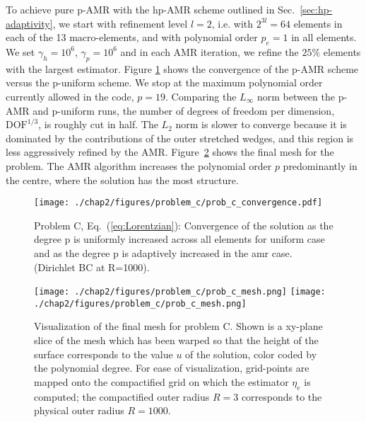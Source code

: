 To achieve pure p-AMR with the hp-AMR scheme
outlined in Sec.~\ref{sec:hp-adaptivity}, we
start with refinement level $l=2$, i.e. with $2^{3 l}=64$ elements in each of the 13 macro-elements, and with polynomial order $p_e=1$ in all elements. We
set $\gamma_h\! =\! 10^6$,
$\gamma_p\! =\! 10^6$ and in each AMR iteration, we refine the $25\%$ elements with the
largest estimator. Figure \ref{fig:prob_c_convergence} shows the
convergence of the p-AMR scheme versus the p-uniform scheme.  We stop
at the maximum polynomial order currently allowed in the
code, $p\!=\!19$. Comparing the $L_\infty$ norm between the p-AMR and p-uniform
runs, the number of degrees of freedom per dimension,
$\mbox{DOF}^{1/3}$, is roughly cut in half.
The $L_2$ norm is slower
to converge because it is dominated by the contributions of the outer
stretched wedges, and this region is less aggressively refined by the
AMR.
Figure~\ref{fig:problem_c_mesh} shows the
final mesh for the problem.  The AMR algorithm increases the polynomial order $p$ predominantly in the centre, where the solution has the most structure.

\begin{figure}
  \centering
  \texttt{[image: ./chap2/figures/problem\_c/prob\_c\_convergence.pdf]}
  \caption{ \label{fig:prob_c_convergence} Problem C,
    Eq.~(\ref{eq:Lorentzian}): Convergence of the solution as the degree p is uniformly
    increased across all elements for uniform case and as the degree p
    is adaptively increased in the amr case.  (Dirichlet BC at
    R=1000).
  }
\end{figure}

\begin{figure}
  \centering
\texttt{[image: ./chap2/figures/problem\_c/prob\_c\_mesh.png]}
    \texttt{[image: ./chap2/figures/problem\_c/prob\_c\_mesh.png]}
  \caption{ Visualization of the final mesh for problem C. Shown is a
    xy-plane slice of the mesh which has been warped so that the
    height of the surface corresponds to the value $u$ of the
    solution, color coded by the polynomial degree. For ease of visualization, grid-points are mapped onto the compactified grid on which the estimator $\eta_e$ is computed; the compactified outer radius $R=3$ corresponds to the physical outer radius $R=1000$.}
  \label{fig:problem_c_mesh}
\end{figure}

